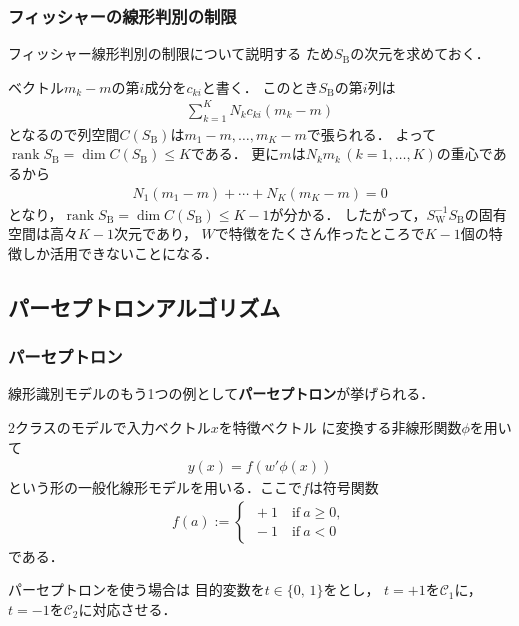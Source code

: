 \documentclass[10pt,%
hyperref={unicode}]{beamer}
\DeclareMathOperator*{\rank}{rank}
\begin{document}
\begin{frame}
    \frametitle{フィッシャーの線形判別の制限}

    フィッシャー線形判別の制限について説明する
    ため$S_\mathrm{B}$の次元を求めておく．

    \bigskip

    ベクトル$m_k - m$の第$i$成分を$c_{ki}$と書く．
    このとき$S_\mathrm{B}$の第$i$列は
    \begin{align*}
        \sum_{k = 1}^K N_k c_{ki} (m_k - m)
    \end{align*}
    となるので列空間$C(S_\mathrm{B})$は$m_1 - m, \ldots, m_K - m $で張られる．
    よって$\rank S_\mathrm{B} = \dim C(S_\mathrm{B}) \leq K$である．
    更に$m$は$N_k m_k\,(k=1,\ldots,K)$の重心であるから
    \begin{align*}
        N_1 (m_1 - m) + \cdots + N_K (m_K - m) = 0
    \end{align*}
    となり，$\rank S_\mathrm{B} = \dim C(S_\mathrm{B}) \leq K - 1$が分かる．
    したがって，$S_\mathrm{W}^{-1}S_\mathrm{B}$の固有空間は高々$K - 1$次元であり，
    $W$で特徴をたくさん作ったところで$K - 1$個の特徴しか活用できないことになる．
\end{frame}

\subsection{パーセプトロンアルゴリズム}
\begin{frame}
    \frametitle{パーセプトロン}
    線形識別モデルのもう1つの例として\textbf{パーセプトロン}が挙げられる．

    \bigskip

    2クラスのモデルで入力ベクトル$x$を特徴ベクトル
    に変換する非線形関数$\phi$を用いて
    \begin{align}
        y(x) = f (w' \phi(x)) \tag{4.52} \label{perceptron}
    \end{align}
    という形の一般化線形モデルを用いる．ここで$f$は符号関数
    \begin{align}
        f(a) :=
        \begin{cases} \,+1\quad\mathrm{if}\ a \geq 0, \\
                      \,-1\quad\mathrm{if}\  a < 0
        \end{cases} \tag{4.53}
    \end{align}
    である．

    \bigskip

    パーセプトロンを使う場合は
    目的変数を$t \in \{0,\,1\}$をとし，
    $t = +1$を$\mathcal{C}_1$に，
    $t = -1$を$\mathcal{C}_2$に対応させる．

\end{frame}
\end{document}
